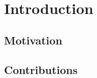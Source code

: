 \chapter{Introduction}\label{chap:intro}

\section{Motivation}\label{sec:motivation}

\section{Contributions}\label{sec:contributions}

